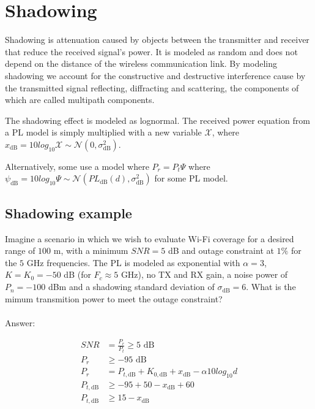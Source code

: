 \documentclass[12pt]{report} %
\begin{document}
\section{Shadowing}
Shadowing is attenuation caused by objects between the transmitter and
receiver that reduce the received signal's power. It is modeled as random and does not depend on the distance of the wireless communication link. By modeling shadowing we account for the constructive and destructive interference cause by the transmitted signal reflecting, diffracting and scattering, the components of which are called multipath components.

The shadowing effect is modeled as lognormal. The received power equation from a \gls{PL} model is simply multiplied with a new variable $\mathcal{X}$, where $x_{\text{dB}} = 10 log_{10}{\mathcal{X}} \sim \mathcal{N}(0,\sigma_{\text{dB}}^2)$.

Alternatively, some use a model where $P_r = P_t \Psi$ where $ \psi_{\text{dB}} = 10 log_{10}{\Psi}  \sim \mathcal{N}(PL_{\text{dB}}(d),\sigma_{\text{dB}}^2)$ for some \gls{PL} model.

\subsection*{Shadowing example}
Imagine a scenario in which we wish to evaluate Wi-Fi coverage for a desired range of $100$ m, with a minimum $SNR = 5$ dB and outage constraint at $1\%$ for the $5$ GHz frequencies. The \gls{PL} is modeled as exponential with $\alpha = 3$, $K = K_0 = -50$ dB (for $F_c \approx 5$ GHz), no TX and RX gain, a noise power of $P_n = -100$ dBm and a shadowing standard deviation of $\sigma_{\text{dB}} = 6$. What is the mimum transmition power to meet the outage constraint?
\\
\\
Answer:

\begin{align}
  SNR             & = \frac{P_r}{P_t} \geq 5 \text{ dB} \nonumber                                       \\
  P_r             & \geq -95 \text{ dB} \nonumber                                                       \\
  P_r             & = P_{t,\text{dB}} + K_{0,\text{dB}} + x_{\text{dB}} - \alpha 10 log_{10}d \nonumber \\
  P_{t,\text{dB}} & \geq -95 + 50 - x_{\text{dB}} + 60 \nonumber                                        \\
  P_{t,\text{dB}} & \geq 15 - x_{\text{dB}} \nonumber
\end{align}
\end{document}
